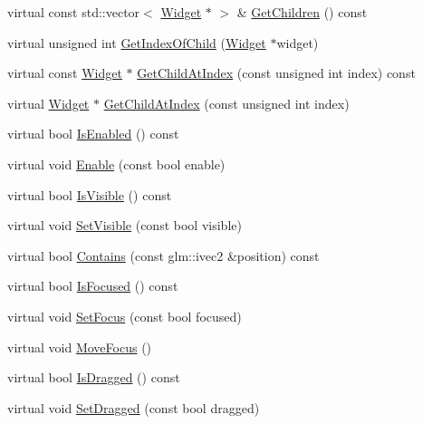 \begin{DoxyCompactItemize}
\item 
virtual const std\+::vector$<$ \mbox{\hyperlink{classngl__gui_1_1_widget}{Widget}} $\ast$ $>$ \& \mbox{\hyperlink{classngl__gui_1_1_widget_a1ab5c80ee91b7d15e1c23197946abf7c}{Get\+Children}} () const
\item 
virtual unsigned int \mbox{\hyperlink{classngl__gui_1_1_widget_aee880f1cad57109b5c850fe5bc4980e2}{Get\+Index\+Of\+Child}} (\mbox{\hyperlink{classngl__gui_1_1_widget}{Widget}} $\ast$widget)
\item 
virtual const \mbox{\hyperlink{classngl__gui_1_1_widget}{Widget}} $\ast$ \mbox{\hyperlink{classngl__gui_1_1_widget_a4b68cbec4ac4ad3437e61a02ad03aa91}{Get\+Child\+At\+Index}} (const unsigned int index) const
\item 
virtual \mbox{\hyperlink{classngl__gui_1_1_widget}{Widget}} $\ast$ \mbox{\hyperlink{classngl__gui_1_1_widget_a3817d437db47f680f168652f2dd2815b}{Get\+Child\+At\+Index}} (const unsigned int index)
\item 
virtual bool \mbox{\hyperlink{classngl__gui_1_1_widget_a1de9607838c7e50775e5311be7a3809f}{Is\+Enabled}} () const
\item 
virtual void \mbox{\hyperlink{classngl__gui_1_1_widget_a68032269b8c0f1dcce8e43a6c887b104}{Enable}} (const bool enable)
\item 
virtual bool \mbox{\hyperlink{classngl__gui_1_1_widget_ac18d5bc5d1c266dcc7ff1daf361a59cf}{Is\+Visible}} () const
\item 
virtual void \mbox{\hyperlink{classngl__gui_1_1_widget_af5ee4fc6ee3299c552dc84bf27f436b1}{Set\+Visible}} (const bool visible)
\item 
virtual bool \mbox{\hyperlink{classngl__gui_1_1_widget_a4199c5d671b55c1de6bcdd4ab2772080}{Contains}} (const glm\+::ivec2 \&position) const
\item 
virtual bool \mbox{\hyperlink{classngl__gui_1_1_widget_af7a939c7989342dc68adec31e55286a0}{Is\+Focused}} () const
\item 
virtual void \mbox{\hyperlink{classngl__gui_1_1_widget_a5b4d8cd7dc8a1b10264800563b56a4bb}{Set\+Focus}} (const bool focused)
\item 
virtual void \mbox{\hyperlink{classngl__gui_1_1_widget_a0e06194379a4760b149d5cf2ba26b360}{Move\+Focus}} ()
\item 
virtual bool \mbox{\hyperlink{classngl__gui_1_1_widget_aa3b991da4a52ef2bfd752b1b94e0594c}{Is\+Dragged}} () const
\item 
virtual void \mbox{\hyperlink{classngl__gui_1_1_widget_ada4143b1aeafac782113a27abeab1145}{Set\+Dragged}} (const bool dragged)

\end{DoxyCompactItemize}
